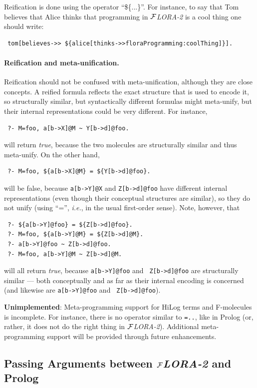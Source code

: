 \documentclass[11pt]{article}
\newcommand{\FLORA}{{\mbox{${\cal F}${\small\it LORA}\rm\emph{-2}}}\xspace}
\begin{document}
Reification is done using the operator ``\$\{...\}''. For instance, to
say that Tom believes that Alice thinks that programming in \FLORA is a
cool thing one should write:
\begin{verbatim}
 tom[believes->> ${alice[thinks->>floraProgramming:coolThing]}].
\end{verbatim}

\paragraph{Reification and meta-unification.}
Reification should not be confused with meta-unification, although they are
close concepts. A reified formula reflects the exact structure that is used
to encode it, so structurally similar, but syntactically different formulas
might meta-unify, but their internal representations could be very different.
For instance, 
\begin{verbatim}
 ?- M=foo, a[b->X]@M ~ Y[b->d]@foo.
\end{verbatim}
will return \emph{true}, because the two molecules are structurally similar
and thus meta-unify. On the other hand,
\begin{verbatim}
 ?- M=foo, ${a[b->X]@M} = ${Y[b->d]@foo}.
\end{verbatim}
will be false, because {\tt a[b->Y]@X} and {\tt Z[b->d]@foo} have different
internal representations (even though their conceptual structures are
similar), so they do not unify (using ``='', {\it i.e.}, in the usual
first-order sense). Note, however, that
\begin{verbatim}
 ?- ${a[b->Y]@foo} = ${Z[b->d]@foo}.
 ?- M=foo, ${a[b->Y]@M} = ${Z[b->d]@M}.
 ?- a[b->Y]@foo ~ Z[b->d]@foo.
 ?- M=foo, a[b->Y]@M ~ Z[b->d]@M.
\end{verbatim}
will all return \emph{true}, because {\tt a[b->Y]@foo} and {\tt
  Z[b->d]@foo} are structurally similar --- both conceptually and as far as
  their
internal encoding is concerned (and likewise are {\tt a[b->Y]@foo} and {\tt
  Z[b->d]@foo}).


{\bf Unimplemented}: Meta-programming support for HiLog terms and
F-molecules is incomplete. For instance, there is no operator similar to
{\tt =..}, like in Prolog (or, rather, it does not do the right thing in
\FLORA). Additional meta-programming support will be provided through
future enhancements.


\subsection{Passing Arguments between \FLORA and Prolog}\label{sec-passing-args}
\end{document}
